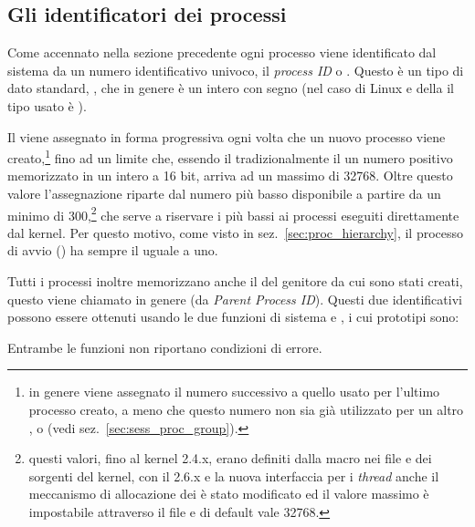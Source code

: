 \subsection{Gli identificatori dei processi}
\label{sec:proc_pid}


Come accennato nella sezione precedente ogni processo viene identificato dal
sistema da un numero identificativo univoco, il \textit{process ID} o
. Questo è un tipo di dato standard, , che in genere è un
intero con segno (nel caso di Linux e della  il tipo usato è
).

Il  viene assegnato in forma progressiva ogni volta che un nuovo
processo viene creato,\footnote{in genere viene assegnato il numero successivo
  a quello usato per l'ultimo processo creato, a meno che questo numero non
  sia già utilizzato per un altro ,  o  (vedi
  sez.~\ref{sec:sess_proc_group}).} fino ad un limite che, essendo il
tradizionalmente il  un numero positivo memorizzato in un intero a 16
bit, arriva ad un massimo di 32768.  Oltre questo valore l'assegnazione
riparte dal numero più basso disponibile a partire da un minimo di
300,\footnote{questi valori, fino al kernel 2.4.x, erano definiti dalla macro
   nei file  e  dei sorgenti del
  kernel, con il 2.6.x e la nuova interfaccia per i \textit{thread} anche il
  meccanismo di allocazione dei  è stato modificato ed il valore
  massimo è impostabile attraverso il file  e di
  default vale 32768.} che serve a riservare i  più bassi ai processi
eseguiti direttamente dal kernel.  Per questo motivo, come visto in
sez.~\ref{sec:proc_hierarchy}, il processo di avvio () ha sempre il
 uguale a uno.


Tutti i processi inoltre memorizzano anche il  del genitore da cui
sono stati creati, questo viene chiamato in genere  (da
\textit{Parent Process ID}).  Questi due identificativi possono essere
ottenuti usando le due funzioni di sistema  e , i
cui prototipi sono:

\begin{funcproto}{ 
}
{Entrambe le funzioni non riportano condizioni di errore.}   
\end{funcproto}

